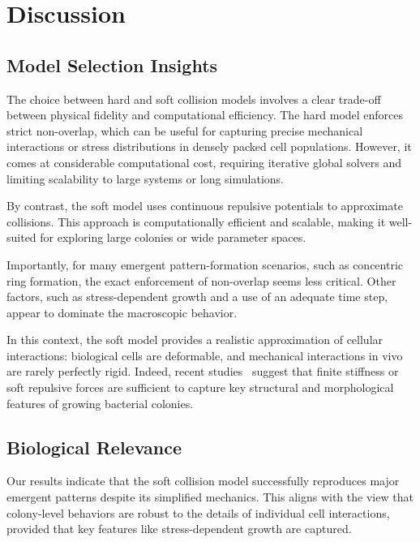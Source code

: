 \documentclass[conference]{IEEEtran}
\begin{document}
\clearpage
\newpage







\newpage
\clearpage

\section{Discussion}

\subsection{Model Selection Insights}

The choice between hard and soft collision models involves a clear trade-off between physical fidelity and computational efficiency.
The hard model enforces strict non-overlap, which can be useful for capturing precise mechanical interactions or stress distributions in densely packed cell populations. However, it comes at considerable computational cost, requiring iterative global solvers and limiting scalability to large systems or long simulations.

By contrast, the soft model uses continuous repulsive potentials to approximate collisions. This approach is computationally efficient and scalable, making it well-suited for exploring large colonies or wide parameter spaces.

Importantly, for many emergent pattern-formation scenarios, such as concentric ring formation, the exact enforcement of non-overlap seems less critical. Other factors, such as stress-dependent growth and a use of an adequate time step, appear to dominate the macroscopic behavior.

In this context, the soft model provides a realistic approximation of cellular interactions: biological cells are deformable, and mechanical interactions in vivo are rarely perfectly rigid. Indeed, recent studies~\cite{Khan_2024, Ghosh2015, SantosDiaz2025} suggest that finite stiffness or soft repulsive forces are sufficient to capture key structural and morphological features of growing bacterial colonies.

\subsection{Biological Relevance}

Our results indicate that the soft collision model successfully reproduces major emergent patterns despite its simplified mechanics. This aligns with the view that colony-level behaviors are robust to the details of individual cell interactions, provided that key features like stress-dependent growth are captured.
\end{document}
